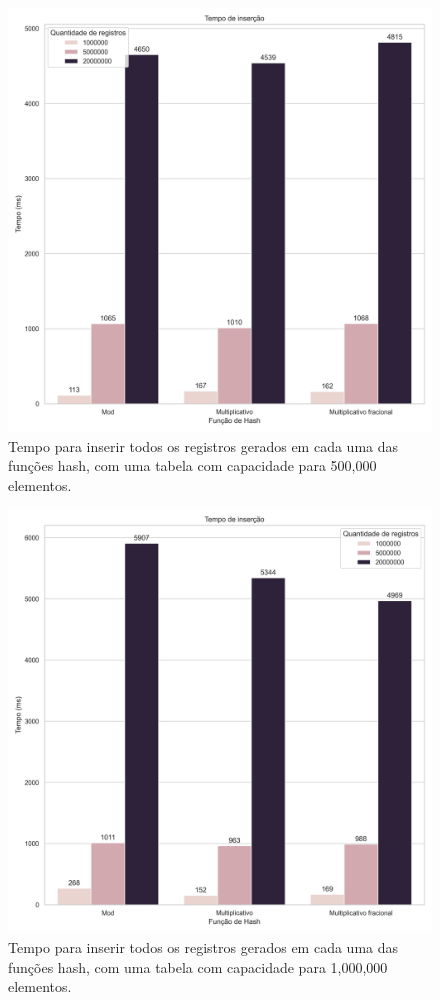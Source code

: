 \documentclass[12pt]{article}
\begin{document}
\newpage
\begin{figure}[ht]
\centering
\includegraphics[width=\textwidth,height=\textheight,keepaspectratio]{figures/InsertionRuntime_500000.png}
\caption{Tempo para inserir todos os registros gerados em cada uma das funções hash, com uma tabela com capacidade para 500,000 elementos.}
\end{figure}

\newpage
\begin{figure}[ht]
\centering
\includegraphics[width=\textwidth,height=\textheight,keepaspectratio]{figures/InsertionRuntime_1000000.png}
\caption{Tempo para inserir todos os registros gerados em cada uma das funções hash, com uma tabela com capacidade para 1,000,000 elementos.}
\end{figure}
\end{document}
